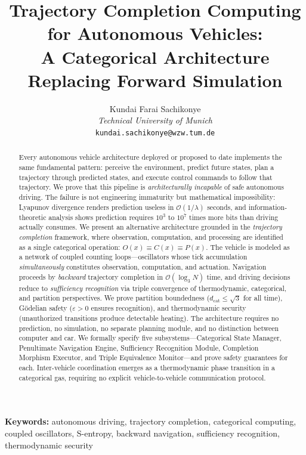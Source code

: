\documentclass[twocolumn,10pt]{article}
\title{\textbf{Trajectory Completion Computing for Autonomous Vehicles:\\A Categorical Architecture Replacing Forward Simulation}}
\author{Kundai Farai Sachikonye\\
\textit{Technical University of Munich}\\
\texttt{kundai.sachikonye@wzw.tum.de}}
\date{}
\theoremstyle{definition}
\newcommand{\dcat}{d_{\mathrm{cat}}}
\newcommand{\BigO}{\mathcal{O}}
\begin{document}
\maketitle

\begin{abstract}
Every autonomous vehicle architecture deployed or proposed to date implements the same fundamental pattern: perceive the environment, predict future states, plan a trajectory through predicted states, and execute control commands to follow that trajectory. We prove that this pipeline is \emph{architecturally incapable} of safe autonomous driving. The failure is not engineering immaturity but mathematical impossibility: Lyapunov divergence renders prediction useless in $\BigO(1/\lambda)$ seconds, and information-theoretic analysis shows prediction requires $10^3$ to $10^7$ times more bits than driving actually consumes. We present an alternative architecture grounded in the \emph{trajectory completion} framework, where observation, computation, and processing are identified as a single categorical operation: $O(x) \equiv C(x) \equiv P(x)$. The vehicle is modeled as a network of coupled counting loops---oscillators whose tick accumulation \emph{simultaneously} constitutes observation, computation, and actuation. Navigation proceeds by \emph{backward} trajectory completion in $\BigO(\log_3 N)$ time, and driving decisions reduce to \emph{sufficiency recognition} via triple convergence of thermodynamic, categorical, and partition perspectives. We prove partition boundedness ($\dcat \leq \sqrt{3}$ for all time), G\"{o}delian safety ($\varepsilon > 0$ ensures recognition), and thermodynamic security (unauthorized transitions produce detectable heating). The architecture requires no prediction, no simulation, no separate planning module, and no distinction between computer and car. We formally specify five subsystems---Categorical State Manager, Penultimate Navigation Engine, Sufficiency Recognition Module, Completion Morphism Executor, and Triple Equivalence Monitor---and prove safety guarantees for each. Inter-vehicle coordination emerges as a thermodynamic phase transition in a categorical gas, requiring no explicit vehicle-to-vehicle communication protocol.
\end{abstract}

\noindent\textbf{Keywords:} autonomous driving, trajectory completion, categorical computing, coupled oscillators, S-entropy, backward navigation, sufficiency recognition, thermodynamic security
\end{document}

